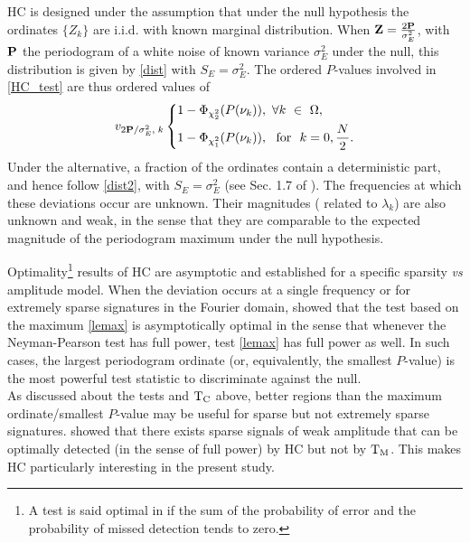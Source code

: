 \documentclass[journal]{IEEEtran}
\begin{document}
HC is  designed under the assumption that under the null hypothesis the  ordinates $\{Z_k\}$ are  i.i.d. with known marginal distribution.
When ${\bf Z}=\frac{2{ \bf{P}}}{\sigma_E^2}$, with ${\bf P}$ the periodogram of a white noise of known  variance $\sigma_E^2$ under the null, this distribution is given by \eqref{dist} with  $S_E=\sigma_E^2$. 
 {
 The ordered $P$-values involved  in \eqref{HC_test} are thus ordered values of
\begin{equation}
v_{  {2{ \bf{P}}}/{\sigma_E^2}  ,\;k}
  \left\{         
      \begin{aligned}
	   &1-\Phi_{\chi^2_{2}}(P(\nu_k)),   ~ \forall k ~ \in ~ \Omega, \\
	    &1-\Phi_{\chi^2_{1}}(P(\nu_k)),   ~ \text{ for } ~ k = 0, \frac{N}{2}.
      \end{aligned}
    \right.
    \label{pval1}    
\end{equation}
}
Under the alternative, a fraction of the ordinates contain a deterministic part, and hence follow \eqref{dist2}, with  $S_E=\sigma_E^2$ ({see Sec. 1.7  of \cite{Donoho_2004}}). The frequencies at which these deviations occur are unknown. Their magnitudes ({ related to} $\lambda_k$) are also unknown and weak, in the sense that they are comparable to the expected magnitude of the periodogram maximum  under the null hypothesis. 

Optimality\footnote{A test is said optimal in \cite{Donoho_2004} if the sum of the probability of error and the probability of missed detection tends to zero.} results of HC are  asymptotic and established for a specific sparsity \textit{vs} amplitude model. 
When the deviation occurs at a single frequency or for extremely sparse signatures in the Fourier domain, 
\cite{Donoho_2004} showed that the test based on the maximum  \eqref{lemax} is asymptotically optimal in the sense that whenever the Neyman-Pearson test has full power, test \eqref{lemax} has full power as well. In such cases, the largest periodogram ordinate (or, equivalently,  the smallest $P$-value) is the most powerful test statistic to discriminate against the null.\\
As discussed about the tests \cite{Shimshoni_1971,Chiu_1989} and ${\rm T_C}$ above, better regions than the maximum ordinate/smallest $P$-value
may be useful for sparse but not extremely sparse signatures. 
\cite{Donoho_2004} showed that there exists sparse signals of weak amplitude that can be  optimally detected (in the sense of full power) by HC but not by ${\rm T_M}$. This makes HC  particularly interesting in the present study.\\
\end{document}
